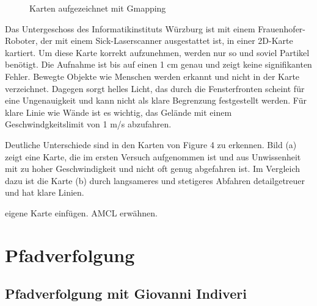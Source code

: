 \documentclass[11pt,a4paper]{article}
\begin{document}
{\begin{figure}[h]
	\centering
	\caption{Karten aufgezeichnet mit Gmapping}
\end{figure}


Das Untergeschoss des Informatikinstituts W\"urzburg ist mit einem Frauenhofer-Roboter, der mit einem Sick-Laserscanner ausgestattet ist, in einer 2D-Karte kartiert.  Um diese Karte korrekt aufzunehmen, werden nur so und soviel Partikel ben\"otigt. Die Aufnahme ist bis auf einen 1 cm genau und zeigt keine signifikanten Fehler. Bewegte Objekte wie Menschen werden erkannt und nicht in der Karte verzeichnet. Dagegen sorgt helles Licht, das durch die Fensterfronten scheint f\"ur eine Ungenauigkeit und kann nicht als klare Begrenzung festgestellt werden. F\"ur klare Linie wie W\"ande ist es wichtig, das Gel\"ande mit einem Geschwindgkeitslimit von 1 m/s abzufahren. 



Deutliche Unterschiede sind in den Karten von Figure 4 zu erkennen. Bild (a) zeigt eine Karte, die im ersten Versuch aufgenommen ist und aus Unwissenheit mit zu hoher Geschwindigkeit und nicht oft genug abgefahren ist. Im Vergleich dazu ist die Karte (b) durch langsameres und stetigeres Abfahren detailgetreuer und hat klare Linien.


eigene Karte einfügen. AMCL erwähnen.


\section{Pfadverfolgung}
\subsection{Pfadverfolgung mit Giovanni Indiveri}
\cite{Giovanni}


}
\end{document}
